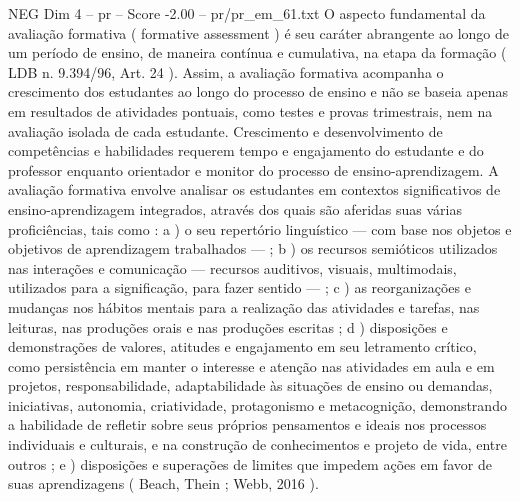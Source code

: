 \begin{textsample}{NEG Dim 4 – pr – Score -2.00 – pr/pr\_em\_61.txt}
O aspecto fundamental da avaliação formativa ( formative assessment ) é seu caráter abrangente ao longo de um período de ensino, de maneira contínua e cumulativa, na etapa da formação ( LDB n. 9.394/96, Art. 24 ).
Assim, a avaliação formativa acompanha o crescimento dos estudantes ao longo do processo de ensino e não se baseia apenas em resultados de atividades pontuais, como testes e provas trimestrais, nem na avaliação isolada de cada estudante.
Crescimento e desenvolvimento de competências e habilidades requerem tempo e engajamento do estudante e do professor enquanto orientador e monitor do processo de ensino-aprendizagem.
A avaliação formativa envolve analisar os estudantes em contextos significativos de ensino-aprendizagem integrados, através dos quais são aferidas suas várias proficiências, tais como : a ) o seu repertório linguístico — com base nos objetos e objetivos de aprendizagem trabalhados — ; b ) os recursos semióticos utilizados nas interações e comunicação — recursos auditivos, visuais, multimodais, utilizados para a significação, para fazer sentido — ; c ) as reorganizações e mudanças nos hábitos mentais para a realização das atividades e tarefas, nas leituras, nas produções orais e nas produções escritas ; d ) disposições e demonstrações de valores, atitudes e engajamento em seu letramento crítico, como persistência em manter o interesse e atenção nas atividades em aula e em projetos, responsabilidade, adaptabilidade às situações de ensino ou demandas, iniciativas, autonomia, criatividade, protagonismo e metacognição, demonstrando a habilidade de refletir sobre seus próprios pensamentos e ideais nos processos individuais e culturais, e na construção de conhecimentos e projeto de vida, entre outros ; e ) disposições e superações de limites que impedem ações em favor de suas aprendizagens ( Beach, Thein ; Webb, 2016 ).

\end{textsample}
